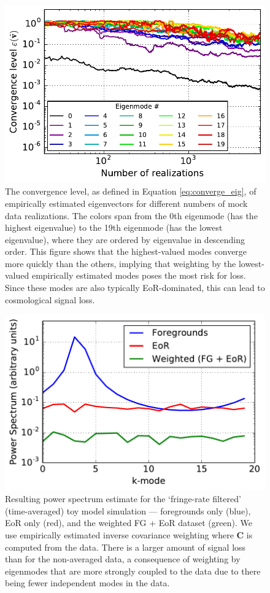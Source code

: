 \documentclass[preprint2,numberedappendix,tighten]{aastex6}  %
\begin{document}
\begin{figure}
	\centering
	\includegraphics[width=\columnwidth]{plots/toy_sigloss17.pdf}
	\caption{The convergence level, as defined in Equation \eqref{eq:converge_eig}, of empirically estimated eigenvectors for different numbers of mock data realizations. The colors span from the 0th eigenmode (has the highest eigenvalue) to the 19th eigenmode (has the lowest eigenvalue), where they are ordered by eigenvalue in descending order. This figure shows that the highest-valued modes converge more quickly than the others, implying that weighting by the lowest-valued empirically estimated modes poses the most risk for loss. Since these modes are also typically EoR-dominated, this can lead to cosmological signal loss.}
	\label{fig:toy_sigloss17}
\end{figure}

\begin{figure}
	\centering
	\includegraphics[trim={0cm 0cm 0cm 0cm},clip,width=\columnwidth]{plots/toy_sigloss7.pdf}
	\caption{Resulting power spectrum estimate for the `fringe-rate filtered' (time-averaged) toy model simulation --- foregrounds only (blue), 
EoR only (red), and the weighted FG + EoR dataset (green). We use empirically estimated inverse covariance weighting where $\textbf{C}$ is 
computed from the data. There is a larger amount of signal loss than for the non-averaged data, a consequence of weighting by eigenmodes that are more strongly coupled to the data due to there being fewer independent modes in the data.}
	\label{fig:toy_sigloss7}
\end{figure}
\end{document}
